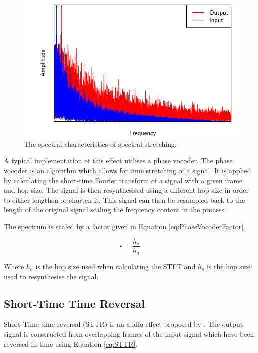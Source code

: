 		\begin{figure}[h!]
			\centering
			\includegraphics{chapter3/Images/SpectralStretchingSpectrum.pdf}
			\caption{The spectral characteristics of spectral stretching.}
			\label{fig:SpectralStretching}
		\end{figure}

		A typical implementation of this effect utilises a phase vocoder. The phase vocoder is an algorithm which
		allows for time stretching of a signal. It is applied by calculating the short-time Fourier transform of a
		signal with a given frame and hop size. The signal is then resynthesised using a different hop size in
		order to either lengthen or shorten it. This signal can then be resampled back to the length of the
		original signal scaling the frequency content in the process. 
		
		The spectrum is scaled by a factor given in Equation \ref{eq:PhaseVocoderFactor}.

		\begin{equation}
			s = \frac{h_{s}}{h_{a}}
			\label{eq:PhaseVocoderFactor}
		\end{equation}

		Where $h_{a}$ is the hop size used when calculating the STFT and $h_{s}$ is the hop size used to
		resynthesise the signal.

	\subsection{Short-Time Time Reversal}
	\label{sec:Excitation-Methods-STTR}
		Short-Time time reversal (STTR) is an audio effect proposed by \citet{kim2014shorttime}. The output signal
		is constructed from overlapping frames of the input signal which have been reversed in time using Equation
		\ref{eq:STTR}.

